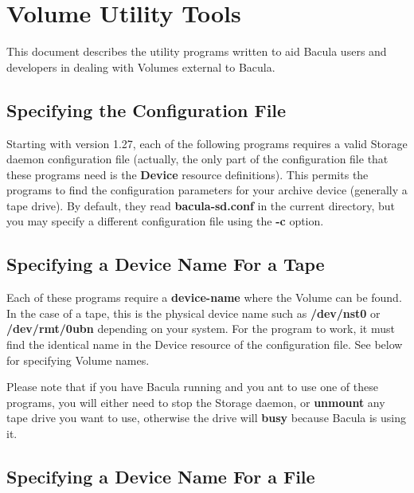 
\chapter{Volume Utility Tools}
\label{_UtilityChapter}

This document describes the utility programs written to aid Bacula users and
developers in dealing with Volumes external to Bacula. 

\section{Specifying the Configuration File}

Starting with version 1.27, each of the following programs requires a valid
Storage daemon configuration file (actually, the only part of the
configuration file that these programs need is the {\bf Device} resource
definitions). This permits the programs to find the configuration parameters
for your archive device (generally a tape drive). By default, they read {\bf
bacula-sd.conf} in the current directory, but you may specify a different
configuration file using the {\bf -c} option. 


\section{Specifying a Device Name For a Tape}

Each of these programs require a {\bf device-name} where the Volume can be
found. In the case of a tape, this is the physical device name such as {\bf
/dev/nst0} or {\bf /dev/rmt/0ubn} depending on your system. For the program to
work, it must find the identical name in the Device resource of the
configuration file. See below for specifying Volume names. 

Please note that if you have Bacula running and you ant to use
one of these programs, you will either need to stop the Storage daemon, or
{\bf unmount} any tape drive you want to use, otherwise the drive
will {\bf busy} because Bacula is using it.


\section{Specifying a Device Name For a File}


